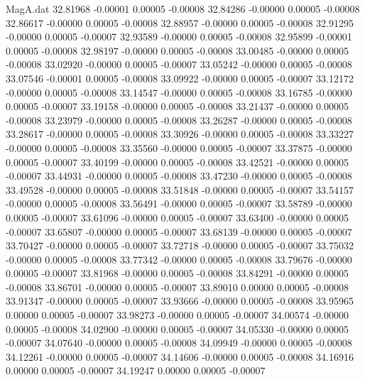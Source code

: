 \begin{filecontents}{MagA.dat}
  32.81968   -0.00001    0.00005   -0.00008
  32.84286   -0.00000    0.00005   -0.00008
  32.86617   -0.00000    0.00005   -0.00008
  32.88957   -0.00000    0.00005   -0.00008
  32.91295   -0.00000    0.00005   -0.00007
  32.93589   -0.00000    0.00005   -0.00008
  32.95899   -0.00001    0.00005   -0.00008
  32.98197   -0.00000    0.00005   -0.00008
  33.00485   -0.00000    0.00005   -0.00008
  33.02920   -0.00000    0.00005   -0.00007
  33.05242   -0.00000    0.00005   -0.00008
  33.07546   -0.00001    0.00005   -0.00008
  33.09922   -0.00000    0.00005   -0.00007
  33.12172   -0.00000    0.00005   -0.00008
  33.14547   -0.00000    0.00005   -0.00008
  33.16785   -0.00000    0.00005   -0.00007
  33.19158   -0.00000    0.00005   -0.00008
  33.21437   -0.00000    0.00005   -0.00008
  33.23979   -0.00000    0.00005   -0.00008
  33.26287   -0.00000    0.00005   -0.00008
  33.28617   -0.00000    0.00005   -0.00008
  33.30926   -0.00000    0.00005   -0.00008
  33.33227   -0.00000    0.00005   -0.00008
  33.35560   -0.00000    0.00005   -0.00007
  33.37875   -0.00000    0.00005   -0.00007
  33.40199   -0.00000    0.00005   -0.00008
  33.42521   -0.00000    0.00005   -0.00007
  33.44931   -0.00000    0.00005   -0.00008
  33.47230   -0.00000    0.00005   -0.00008
  33.49528   -0.00000    0.00005   -0.00008
  33.51848   -0.00000    0.00005   -0.00007
  33.54157   -0.00000    0.00005   -0.00008
  33.56491   -0.00000    0.00005   -0.00007
  33.58789   -0.00000    0.00005   -0.00007
  33.61096   -0.00000    0.00005   -0.00007
  33.63400   -0.00000    0.00005   -0.00007
  33.65807   -0.00000    0.00005   -0.00007
  33.68139   -0.00000    0.00005   -0.00007
  33.70427   -0.00000    0.00005   -0.00007
  33.72718   -0.00000    0.00005   -0.00007
  33.75032   -0.00000    0.00005   -0.00008
  33.77342   -0.00000    0.00005   -0.00008
  33.79676   -0.00000    0.00005   -0.00007
  33.81968   -0.00000    0.00005   -0.00008
  33.84291   -0.00000    0.00005   -0.00008
  33.86701   -0.00000    0.00005   -0.00007
  33.89010    0.00000    0.00005   -0.00008
  33.91347   -0.00000    0.00005   -0.00007
  33.93666   -0.00000    0.00005   -0.00008
  33.95965    0.00000    0.00005   -0.00007
  33.98273   -0.00000    0.00005   -0.00007
  34.00574   -0.00000    0.00005   -0.00008
  34.02900   -0.00000    0.00005   -0.00007
  34.05330   -0.00000    0.00005   -0.00007
  34.07640   -0.00000    0.00005   -0.00008
  34.09949   -0.00000    0.00005   -0.00008
  34.12261   -0.00000    0.00005   -0.00007
  34.14606   -0.00000    0.00005   -0.00008
  34.16916    0.00000    0.00005   -0.00007
  34.19247    0.00000    0.00005   -0.00007

\end{filecontents}
